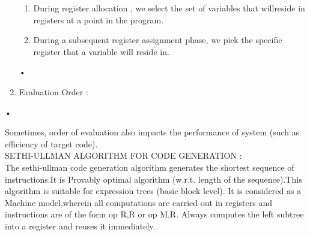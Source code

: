 \documentclass[11pt]{article}
\begin{document}
\begin{enumerate}
		\begin{enumerate}
			\item During register allocation , we select the set of variables that willreside in registers at a point in the program.
			\item During a subsequent register assignment phase, we pick the specific register that a variable will reside in.
		\end{enumerate}•
		\item Evaluation Order :
		
	\end{enumerate}•
	
	Sometimes, order of evaluation also impacts the performance of system (such as efficiency of target code).\\
	
	
	\noindent
	SETHI-ULLMAN ALGORITHM FOR CODE GENERATION :\\
	The sethi-ullman code generation algorithm generates the shortest sequence of instructions.It is Provably optimal algorithm (w.r.t. length of the sequence).This algorithm is suitable for expression trees (basic block level). It is considered as a Machine model,wherein all computations are carried out in registers and instructions are of the form op R,R or op M,R. Always computes the left subtree into a register and reuses it immediately.\\
	
\end{document}

